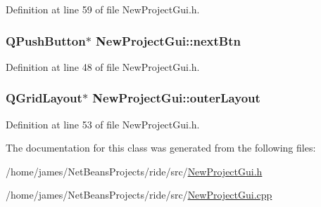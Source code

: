 Definition at line 59 of file New\-Project\-Gui.\-h.

\hypertarget{class_new_project_gui_af79d8f88c0d0aa8e783240c2e6ba6e8b}{
\subsubsection[{next\-Btn}]{\setlength{\rightskip}{0pt plus 5cm}Q\-Push\-Button$\ast$ New\-Project\-Gui\-::next\-Btn\hspace{0.3cm}{\ttfamily [private]}}}\label{class_new_project_gui_af79d8f88c0d0aa8e783240c2e6ba6e8b}


Definition at line 48 of file New\-Project\-Gui.\-h.

\hypertarget{class_new_project_gui_ab8c8c2da1803bbbc90d8aa5e90ac9aec}{
\subsubsection[{outer\-Layout}]{\setlength{\rightskip}{0pt plus 5cm}Q\-Grid\-Layout$\ast$ New\-Project\-Gui\-::outer\-Layout\hspace{0.3cm}{\ttfamily [private]}}}\label{class_new_project_gui_ab8c8c2da1803bbbc90d8aa5e90ac9aec}


Definition at line 53 of file New\-Project\-Gui.\-h.



The documentation for this class was generated from the following files\-:\begin{DoxyCompactItemize}
\item 
/home/james/\-Net\-Beans\-Projects/ride/src/\hyperlink{_new_project_gui_8h}{New\-Project\-Gui.\-h}\item 
/home/james/\-Net\-Beans\-Projects/ride/src/\hyperlink{_new_project_gui_8cpp}{New\-Project\-Gui.\-cpp}\end{DoxyCompactItemize}
